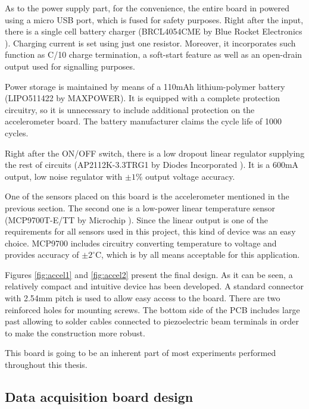\documentclass[12pt,a4paper]{article}
\begin{document}
As to the power supply part, for the convenience, the entire board in powered using a micro USB port, which is fused for safety purposes. Right after the input, there is a single cell battery charger (BRCL4054CME by Blue Rocket Electronics \cite{charger_params}). Charging current is set using just one resistor. Moreover, it incorporates such function as C/10 charge termination, a soft-start feature as well as an open-drain output used for signalling purposes.
\par
Power storage is maintained by means of a 110mAh lithium-polymer battery (LIPO511422 by MAXPOWER). It is equipped with a complete protection circuitry, so it is unnecessary to include additional protection on the accelerometer board. The battery manufacturer claims the cycle life of 1000 cycles.
\par

Right after the ON/OFF switch, there is a low dropout linear regulator supplying the rest of circuits (AP2112K-3.3TRG1 by Diodes Incorporated \cite{ap2112_params}). It is a 600mA output, low noise regulator with $\pm{1}\%$ output voltage accuracy.
\par

One of the sensors placed on this board is the accelerometer mentioned in the previous section. The second one is a low-power linear temperature sensor (MCP9700T-E/TT by Microchip \cite{mcp9700_params}). Since the linear output is one of the requirements for all sensors used in this project, this kind of device was an easy choice. MCP9700 includes circuitry converting temperature to voltage and provides accuracy of $\pm{2}^\circ $C, which is by all means acceptable for this application.
\par

Figures \ref{fig:accel1} and \ref{fig:accel2} present the final design. As it can be seen, a relatively compact and intuitive device has been developed. A standard connector with 2.54mm pitch is used to allow easy access to the board. There are two reinforced holes for mounting screws. The bottom side of the PCB includes large past allowing to solder cables connected to piezoelectric beam terminals in order to make the construction more robust.
\par

This board is going to be an inherent part of most experiments performed throughout this thesis.
\par

\subsection{Data acquisition board design}
\end{document}
